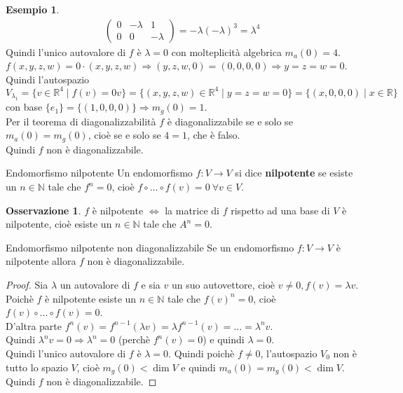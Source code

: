 \documentclass[a4paper]{article}
\theoremstyle{definition}
\newtheorem*{oss}{Osservazione}
\newtheorem*{es}{Esempio}
\begin{document}
\begin{es}
\begin{align*}
\begin{pmatrix}
				0 & - \lambda & 1 \\
				0 & 0 & - \lambda
			\end{pmatrix} = - \lambda (- \lambda)^3 = \lambda^4
		\end{align*}
		Quindi l'unico autovalore di $f$ è $\lambda = 0$ con molteplicità algebrica $m_a(0) = 4$. \\
		$f(x, y, z, w) = 0 \cdot (x, y, z, w) \Rightarrow (y, z, w, 0) = (0, 0, 0, 0) \Rightarrow y = z = w = 0$.
		Quindi l'autospazio $V_{\lambda_1} = \{v \in \mathbb{R}^4 \mid f(v) = 0v\} = \{(x, y, z, w) \in \mathbb{R}^4 \mid y = z = w = 0\} = \{(x, 0, 0, 0) \mid x \in \mathbb{R}\}$
		con base $\{e_1\} = \{(1, 0, 0, 0)\} \Rightarrow m_g(0) = 1$. \\
		Per il teorema di diagonalizzabilità $f$ è diagonalizzabile se e solo se $m_a(0) = m_g(0)$, cioè se e solo se $4 = 1$, che è falso. \\
		Quindi $f$ non è diagonalizzabile.
	\end{es}

	\begin{deff}{Endomorfismo nilpotente}{}
		Un endomorfismo $f: V \to V$ si dice \textbf{nilpotente} se esiste un $n \in \mathbb{N}$ tale che $f^n = 0$, cioè $f \circ ... \circ f(v) = 0 \ \forall v \in V$.
	\end{deff}
	\begin{oss}
		$f$ è nilpotente $\Leftrightarrow$ la matrice di $f$ rispetto ad una base di $V$ è nilpotente, cioè esiste un $n \in \mathbb{N}$ tale che $A^n = 0$.
	\end{oss}

	\begin{teo}{Endomorfismo nilpotente non diagonalizzabile}{}
		Se un endomorfismo $f: V \to V$ è nilpotente allora $f$ non è diagonalizzabile.
	\end{teo}
	\begin{proof}
		Sia $\lambda$ un autovalore di $f$ e sia $v$ un suo autovettore, cioè $v \ne 0, f(v) = \lambda v$. \\
		Poichè $f$ è nilpotente esiste un $n \in \mathbb{N}$ tale che $f(v)^n = 0$, cioè $f(v) \circ ... \circ f(v) = 0$. \\
		D'altra parte $f^n(v) = f^{n-1}(\lambda v) = \lambda f^{n-1}(v) = ... = \lambda^n v$. \\
		Quindi $\lambda^nv = 0 \Rightarrow \lambda^n = 0$ (perchè $f^n(v) = 0$) e quindi $\lambda = 0$. \\
		Quindi l'unico autovalore di $f$ è $\lambda = 0$. Quindi poichè $f \ne 0$, l'autospazio $V_0$ non è tutto lo spazio $V$,
		cioè $m_g(0) < \dim V$ e quindi $m_a(0) = m_g(0) < \dim V$.
		Quindi $f$ non è diagonalizzabile.
	\end{proof}
\end{document}
